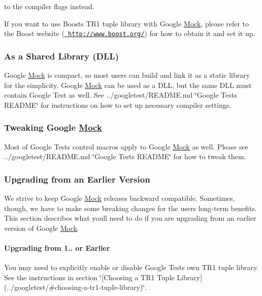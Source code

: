 to the compiler flags instead.

If you want to use Boost\textquotesingle{}s T\+R1 tuple library with Google \mbox{\hyperlink{class_mock}{Mock}}, please refer to the Boost website (\href{http://www.boost.org/}\texttt{ http\+://www.\+boost.\+org/}) for how to obtain it and set it up.

\subsubsection*{As a Shared Library (D\+LL)}

Google \mbox{\hyperlink{class_mock}{Mock}} is compact, so most users can build and link it as a static library for the simplicity. Google \mbox{\hyperlink{class_mock}{Mock}} can be used as a D\+LL, but the same D\+LL must contain Google Test as well. See ../googletest/\+R\+E\+A\+D\+ME.md \char`\"{}\+Google Test\textquotesingle{}s R\+E\+A\+D\+M\+E\char`\"{} for instructions on how to set up necessary compiler settings.

\subsubsection*{Tweaking Google \mbox{\hyperlink{class_mock}{Mock}}}

Most of Google Test\textquotesingle{}s control macros apply to Google \mbox{\hyperlink{class_mock}{Mock}} as well. Please see ../googletest/\+R\+E\+A\+D\+ME.md \char`\"{}\+Google Test\textquotesingle{}s R\+E\+A\+D\+M\+E\char`\"{} for how to tweak them.

\subsubsection*{Upgrading from an Earlier Version}

We strive to keep Google \mbox{\hyperlink{class_mock}{Mock}} releases backward compatible. Sometimes, though, we have to make some breaking changes for the users\textquotesingle{} long-\/term benefits. This section describes what you\textquotesingle{}ll need to do if you are upgrading from an earlier version of Google \mbox{\hyperlink{class_mock}{Mock}}.

\paragraph*{Upgrading from 1.. or Earlier}

You may need to explicitly enable or disable Google Test\textquotesingle{}s own T\+R1 tuple library. See the instructions in section \char`\"{}\mbox{[}\+Choosing a T\+R1 Tuple
\+Library\mbox{]}(../googletest/\#choosing-\/a-\/tr1-\/tuple-\/library)\char`\"{}.

